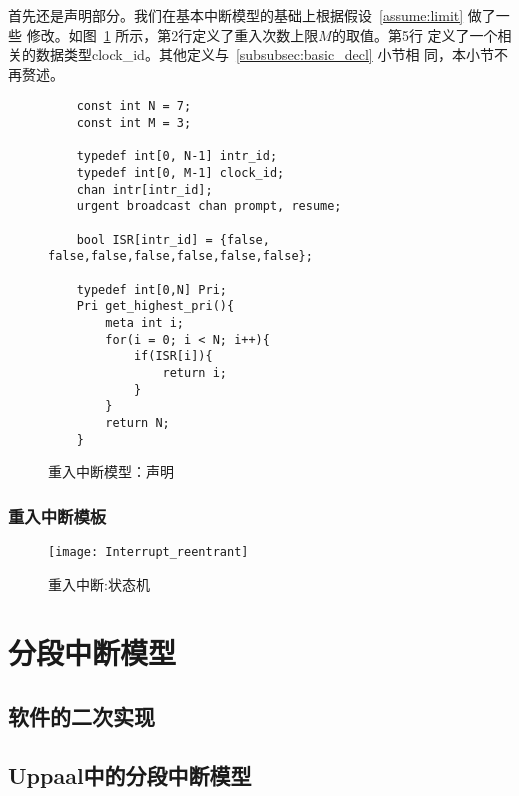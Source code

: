 首先还是声明部分。我们在基本中断模型的基础上根据假设~\ref{assume:limit} 做了一些
修改。如图~\ref{fig:reentrant_decl} 所示，第2行定义了重入次数上限$M$的取值。第5行
定义了一个相关的数据类型clock\_id。其他定义与~\ref{subsubsec:basic_decl} 小节相
同，本小节不再赘述。

\begin{figure}[H]
	\centering
	\begin{lstlisting}
	const int N = 7;
	const int M = 3;
	
	typedef int[0, N-1] intr_id; 
	typedef int[0, M-1] clock_id;
	chan intr[intr_id];
	urgent broadcast chan prompt, resume;
	
	bool ISR[intr_id] = {false, false,false,false,false,false,false};
	
	typedef int[0,N] Pri;
	Pri get_highest_pri(){
		meta int i;
		for(i = 0; i < N; i++){
			if(ISR[i]){
				return i;
			} 
		}
		return N;
	}
	\end{lstlisting}
	\caption{重入中断模型：声明}
	\label{fig:reentrant_decl}
\end{figure}

\subsubsection{重入中断模板}
\label{subsubsec:reentrant_intr}


\begin{figure}[H]
	\centering
	\texttt{[image: Interrupt\_reentrant]}
	\caption{重入中断:状态机}
	\label{fig:Interrupt_reentrant}
\end{figure}

\section{分段中断模型}
\label{sec:segment}

\subsection{软件的二次实现}
\label{subsec:segment_software}

\subsection{Uppaal中的分段中断模型}
\label{subsec:segment_uppaal}